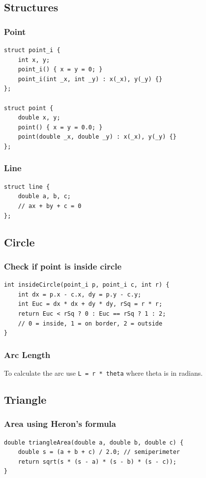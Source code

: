 \documentclass[10pt]{article}
\begin{document}
\begin{multicols*}{2}
\subsection{Structures}
\subsubsection{Point}
\begin{lstlisting}[style=compactcpp]
struct point_i {
    int x, y;
    point_i() { x = y = 0; }
    point_i(int _x, int _y) : x(_x), y(_y) {}
};

struct point {
    double x, y;
    point() { x = y = 0.0; }
    point(double _x, double _y) : x(_x), y(_y) {}
};
\end{lstlisting}

\subsubsection{Line}
\begin{lstlisting}[style=compactcpp]
struct line {
    double a, b, c;
    // ax + by + c = 0
};
\end{lstlisting}

\subsection{Circle}
\subsubsection{Check if point is inside circle}
\begin{lstlisting}[style=compactcpp]
int insideCircle(point_i p, point_i c, int r) {
    int dx = p.x - c.x, dy = p.y - c.y;
    int Euc = dx * dx + dy * dy, rSq = r * r;
    return Euc < rSq ? 0 : Euc == rSq ? 1 : 2;
    // 0 = inside, 1 = on border, 2 = outside
}
\end{lstlisting}

\subsubsection{Arc Length}
To calculate the arc use \texttt{L = r * theta} where theta is in radians.

\subsection{Triangle}
\subsubsection{Area using Heron's formula}
\begin{lstlisting}[style=compactcpp]
double triangleArea(double a, double b, double c) {
    double s = (a + b + c) / 2.0; // semiperimeter
    return sqrt(s * (s - a) * (s - b) * (s - c));
}
\end{lstlisting}


\end{multicols*}
\end{document}

